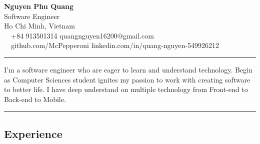 \documentclass[11pt,letterpaper]{article}
\begin{document}
\begin{center}
    {\LARGE \textbf{Nguyen Phu Quang}}\\
    \vspace{0.2cm}
    Software Engineer\\
    \vspace{0.2cm}
    Ho Chi Minh, Vietnam
    \vspace{0.5cm}
    \\
    \raisebox{-0.2\height} {\Large \faPhoneSquare} \ \  +84 913501314 \hfill quangnguyen16200@gmail.com \ \ \raisebox{-0.2\height}{\Large \faEnvelopeSquare}
    \\
    \raisebox{-0.2\height}{\Large \faGithubSquare} \ \ github.com/McPepperoni \hfill linkedin.com/in/quang-nguyen-549926212 \raisebox{-0.2\height}{\Large \faLinkedinSquare}
\end{center}

\hrule
\vspace{.5cm}
\justifying
I'm a software engineer who are eager to learn and understand technology. Begin as Computer Sciences student ignites my passion to work with creating software to better life. I have deep understand on multiple technology
from Front-end to Back-end to Mobile.
\vspace{.5cm}

\hrule
\vspace{-1em}
\subsection*{\Large Experience}
\end{document}
